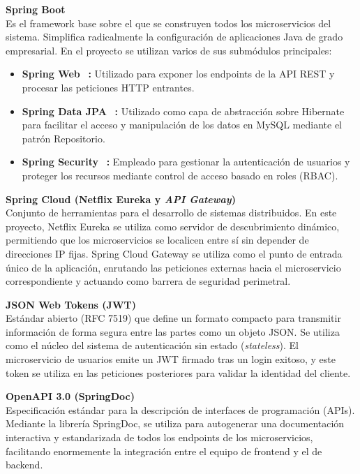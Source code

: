         \textbf{Spring Boot} ~\cite{SpringBootDocs} \\
        Es el framework base sobre el que se construyen todos los microservicios del sistema. Simplifica radicalmente la configuración de aplicaciones Java de grado empresarial. En el proyecto se utilizan varios de sus submódulos principales:
        \begin{itemize}
            \item \textbf{Spring Web} ~\cite{SpringWeb}\textbf{:} Utilizado para exponer los endpoints de la API REST y procesar las peticiones HTTP entrantes.
            \item \textbf{Spring Data JPA} ~\cite{SpringDataJPA}\textbf{:} Utilizado como capa de abstracción sobre Hibernate para facilitar el acceso y manipulación de los datos en MySQL mediante el patrón Repositorio.
            \item \textbf{Spring Security} ~\cite{SpringSecurity}\textbf{:} Empleado para gestionar la autenticación de usuarios y proteger los recursos mediante control de acceso basado en roles (RBAC).
        \end{itemize}
        
        \textbf{Spring Cloud (Netflix Eureka y \textit{API Gateway})} ~\cite{SpringCloud} ~\cite{SpringCloudNetflix} ~\cite{SpringCloudGateway} \\
        Conjunto de herramientas para el desarrollo de sistemas distribuidos. En este proyecto, Netflix Eureka se utiliza como servidor de descubrimiento dinámico, permitiendo que los microservicios se localicen entre sí sin depender de direcciones IP fijas. Spring Cloud Gateway se utiliza como el punto de entrada único de la aplicación, enrutando las peticiones externas hacia el microservicio correspondiente y actuando como barrera de seguridad perimetral.
        
        \textbf{JSON Web Tokens (JWT)} ~\cite{RFC7519} \\
        Estándar abierto (RFC 7519) que define un formato compacto para transmitir información de forma segura entre las partes como un objeto JSON. Se utiliza como el núcleo del sistema de autenticación sin estado (\textit{stateless}). El microservicio de usuarios emite un JWT firmado tras un login exitoso, y este token se utiliza en las peticiones posteriores para validar la identidad del cliente.
        
        \textbf{OpenAPI 3.0 (SpringDoc)} ~\cite{OpenAPI} ~\cite{SpringDoc} \\
        Especificación estándar para la descripción de interfaces de programación (APIs). Mediante la librería SpringDoc, se utiliza para autogenerar una documentación interactiva y estandarizada de todos los endpoints de los microservicios, facilitando enormemente la integración entre el equipo de frontend y el de backend.
    
